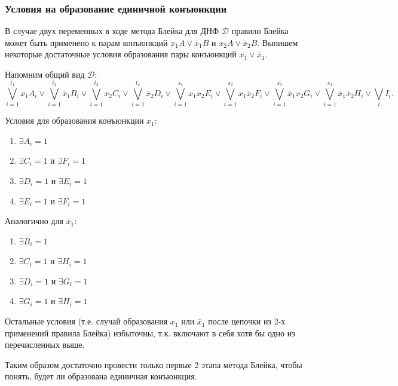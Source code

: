 \documentclass[12pt,a4paper,oneside,fleqn,leqno]{article}
\theoremstyle{definition}
\begin{document}
		\subsubsection*{Условия на образование единичной конъюнкции}
		В случае двух переменных в ходе метода Блейка для ДНФ $\mathcal{D}$ правило Блейка может быть применено к парам конъюнкций $x_1A \vee \bar{x}_1B$ и $x_2A \vee \bar{x}_2B.$ Выпишем некоторые достаточные условия образования пары конъюнкций $x_1 \vee \bar{x}_1.$\par
		Напомним общий вид $\mathcal{D}$:
			$$
				\bigvee_{i = 1}^{t_1}x_1A_i \vee \bigvee_{i = 1}^{t_2}\bar{x}_1B_i \vee \bigvee_{i = 1}^{t_3}x_2C_i \vee \bigvee_{i = 1}^{t_4}\bar{x}_2D_i \vee \bigvee_{i = 1}^{s_1}x_1x_2E_i \vee \bigvee_{i = 1}^{s_2}x_1\bar{x}_2F_i \vee \bigvee_{i = 1}^{s_3}\bar{x}_1x_2G_i \vee \bigvee_{i = 1}^{s_4}\bar{x}_1\bar{x}_2H_i \vee \bigvee_iI_i.
			$$\par
		\begin{minipage}[t]{0.5\textwidth}
		Условия для образования конъюнкции $x_1$:
		\begin{enumerate}
			\item
			$\exists A_i = 1$
			\item
			$\exists C_i = 1$ и $\exists F_i = 1$
			\item
			$\exists D_i = 1$ и $\exists E_i = 1$
			\item
			$\exists E_i = 1$ и $\exists F_i = 1$\vspace{10pt}
		\end{enumerate}
		\end{minipage}
		\hfill
		\begin{minipage}[t]{0.4\textwidth}
		Аналогично для $\bar{x}_1$:
		\begin{enumerate}
			\item
			$\exists B_i = 1$
			\item
			$\exists C_i = 1$ и $\exists H_i = 1$
			\item
			$\exists D_i = 1$ и $\exists G_i = 1$
			\item
			$\exists G_i = 1$ и $\exists H_i = 1$
		\end{enumerate}
		\end{minipage}\par
		Остальные условия (т.е. случай образования $x_1$ или $\bar{x}_1$ после цепочки из 2-х применений правила Блейка) избыточны, т.к. включают в себя хотя бы одно из перечисленных выше.\par
		Таким образом достаточно провести только первые 2 этапа метода Блейка, чтобы понять, будет ли образована единичная конъюнкция.
\end{document}

